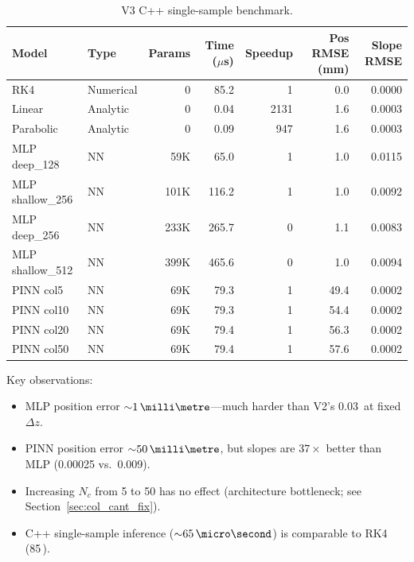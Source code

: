 \documentclass[11pt,a4paper]{article}
\newcommand{\SI}[2]{#1\,\text{#2}}
\newcommand{\num}[1]{#1}
\newcommand{\dz}{\Delta z}
\begin{document}
\begin{table}[H]
\centering
\caption{V3 C++ single-sample benchmark.}
\label{tab:v3}
\begin{tabular}{@{} l l r r r
  r r @{}}
\toprule
Model & Type & Params & Time ($\mu$s) & Speedup
  & Pos RMSE (mm) & Slope RMSE \\
\midrule
RK4 & Numerical & 0 & 85.2 & 1 & 0.0 & 0.0000 \\
Linear & Analytic & 0 & 0.04 & 2131 & 1.6 & 0.0003 \\
Parabolic & Analytic & 0 & 0.09 & 947 & 1.6 & 0.0003 \\
\midrule
MLP deep\_128 & NN & 59K & 65.0 & 1 & 1.0 & 0.0115 \\
MLP shallow\_256 & NN & 101K & 116.2 & 1 & 1.0 & 0.0092 \\
MLP deep\_256 & NN & 233K & 265.7 & 0 & 1.1 & 0.0083 \\
MLP shallow\_512 & NN & 399K & 465.6 & 0 & 1.0 & 0.0094 \\
\midrule
PINN col5 & NN & 69K & 79.3 & 1 & 49.4 & 0.0002 \\
PINN col10 & NN & 69K & 79.3 & 1 & 54.4 & 0.0002 \\
PINN col20 & NN & 69K & 79.4 & 1 & 56.3 & 0.0002 \\
PINN col50 & NN & 69K & 79.4 & 1 & 57.6 & 0.0002 \\
\bottomrule
\end{tabular}
\end{table}

Key observations:
\begin{itemize}[nosep]
  \item MLP position error ${\sim}\SI{1}{\milli\metre}$---much harder
        than V2's \SI{0.03}{\milli\metre} at fixed $\dz$.
  \item PINN position error ${\sim}\SI{50}{\milli\metre}$, but slopes are
        $37\times$ better than MLP (\num{0.00025} vs.\ \num{0.009}).
  \item Increasing $N_c$ from 5 to 50 has no effect (architecture
        bottleneck; see Section~\ref{sec:col_cant_fix}).
  \item C++ single-sample inference (${\sim}\SI{65}{\micro\second}$) is
        comparable to RK4 (\SI{85}{\micro\second}).
\end{itemize}
\end{document}
